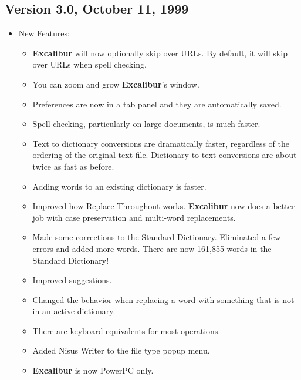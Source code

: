 \documentclass[11pt,titlepage]{article}
\newcommand{\ex}{\textbf{Excalibur}}
\begin{document}
\subsection{Version 3.0, October 11, 1999}

\begin{itemize}
\item New Features:

  \begin{itemize}

  \item \ex{} will now optionally skip over URLs.  By default, it will
    skip over URLs when spell checking.

  \item You can zoom and grow \ex's window.

  \item Preferences are now in a tab panel and they are automatically
    saved.

  \item Spell checking, particularly on large documents, is much
    faster.

  \item Text to dictionary conversions are dramatically faster,
    regardless of the ordering of the original text file.  Dictionary
    to text conversions are about twice as fast as before.

  \item Adding words to an existing dictionary is faster.

  \item Improved how Replace Throughout works.  \ex{} now does a
    better job with case preservation and multi-word replacements.

  \item Made some corrections to the Standard Dictionary.  Eliminated
    a few errors and added more words. There are now 161,855 words in
    the Standard Dictionary!

  \item Improved suggestions.

  \item Changed the behavior when replacing a word with something that
    is not in an active dictionary.

  \item There are keyboard equivalents for most operations.

  \item Added Nisus Writer to the file type popup menu.

  \item \ex{} is now PowerPC only.


\end{itemize}
\end{itemize}
\end{document}
